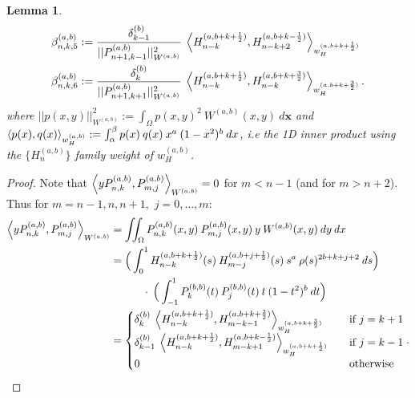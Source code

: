 \documentclass[11pt, oneside]{article}   	%
\newcommand{\half}{\frac{1}{2}}
\newcommand{\Pnkab}{P_{n,k}^{(a,b)}}
\newcommand{\Wab}{{W^{(a,b)}}}
\newcommand{\Pmjab}{P_{m,j}^{(a,b)}}
\newcommand{\betaab}{\beta^{(a,b)}}
\newtheorem{lemma}{Lemma}
\begin{document}
\begin{lemma}
\begin{align}
\betaab_{n,k,5} &:= \frac{\delta_{k-1}^{(b)}}{|| P_{n+1,k-1}^{(a,b)} ||_{W^{(a,b)}}^2} \: \ip<H_{n-k}^{(a, b+k+\half)}, H_{n-k+2}^{(a, b+k-\half)}>_{w_H^{(a, b+k+\half)}} \\
\betaab_{n,k,6} &:= \frac{\delta_{k}^{(b)}}{|| P_{n+1,k+1}^{(a,b)} ||_{W^{(a,b)}}^2} \: \ip<H_{n-k}^{(a, b+k+\half)}, H_{n-k}^{(a, b+k+\frac{3}{2})}>_{w_H^{(a, b+k+\frac{3}{2})}}. 
\end{align}
where $|| p(x,y) ||_{W^{(a,b)}}^2 := \int_\Omega p(x,y)^2 \: \Wab(x,y) \: d\mathbf{x}$ and $\ip<p(x), q(x)>_{w_H^{(a, b)}} := \int_\alpha^\beta p(x) \: q(x) \: x^a \: (1-x^2)^b \: dx$, i.e the 1D inner product using the $\{H^{(a,b)}_n\}$ family weight of $w_H^{(a, b)}$.

\end{lemma}

\begin{proof}
Note that \(\ip<y \Pnkab, P_{m,j}^{(a,b)}>_\Wab = 0\) for \(m < n-1\) (and for \(m > n+2\)). Thus for \(m = n-1, n, n+1,\) \(j = 0,\dots,m:\)
\begin{align}
\ip<y \Pnkab, P_{m,j}^{(a,b)}>_\Wab &=  \iint_\Omega \Pnkab(x,y) \: \Pmjab(x,y) \: y \: \Wab(x,y) \: dy \: dx \\
&= \Big( \int^1_0 H_{n-k}^{(a, b+k+\half)}(s) \: H_{m-j}^{(a, b+j+\half)}(s) \: s^a \: \rho(s)^{2b+k+j+2} \: ds \Big) \nonumber \\
& \quad \quad \quad\cdot \: \Big( \int^1_{-1} P_k^{(b,b)}(t) \: P_j^{(b,b)}(t) \: t \: (1-t^2)^b \: dt \Big) \\
&= \begin{cases}
    	\delta_k^{(b)} \: \ip<H_{n-k}^{(a, b+k+\half)}, H_{m-k-1}^{(a, b+k+\frac{3}{2})}>_{w_H^{(a, b+k+\frac{3}{2})}} \quad& \text{if } j = k+1 \\
	\delta_{k-1}^{(b)} \: \ip<H_{n-k}^{(a, b+k+\half)}, H_{m-k+1}^{(a, b+k-\half)}>_{w_H^{(a, b+k+\half)}} \quad& \text{if } j = k-1 \\
	0 & \text{otherwise}
      \end{cases}.
\end{align}

\end{proof}
\end{document}
